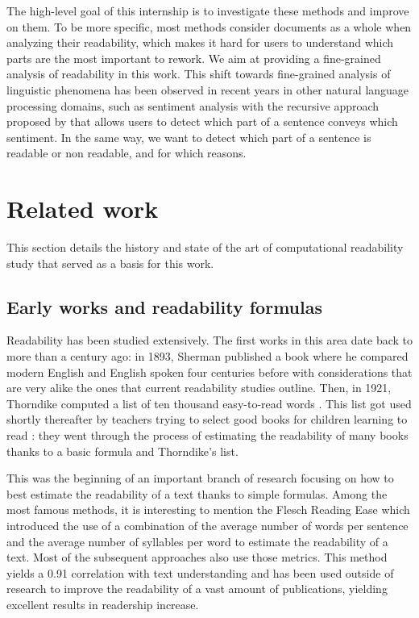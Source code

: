 \documentclass[a4paper, 11pt, onepage]{scrreprt}
\begin{document}
The high-level goal of this internship is to investigate these methods
and improve on them. To be more specific, most methods consider
documents as a whole when analyzing their readability, which makes it
hard for users to understand which parts are the most important to
rework. We aim at providing a fine-grained analysis of readability in
this work. This shift towards fine-grained analysis of linguistic
phenomena has been observed in recent years in other natural language
processing domains, such as sentiment analysis with the recursive
approach proposed by \cite{socher2013recursive} that allows users to
detect which part of a sentence conveys which sentiment. In the same
way, we want to detect which part of a sentence is readable or non
readable, and for which reasons.

\chapter{Related work}
\label{cha:sota}

This section details the history and state of the art of computational
readability study that served as a basis for this work.

\section{Early works and readability formulas}
\label{sec:early-works-and-formulas}
Readability has been studied extensively. The first works in this area
date back to more than a century ago: in 1893, Sherman published a
book \cite{sherman1893analytics} where he compared modern English and
English spoken four centuries before with considerations that are very
alike the ones that current readability studies outline. Then, in
1921, Thorndike computed a list of ten thousand easy-to-read words
\cite{thorndike1921teacher}. This list got used shortly thereafter by
teachers trying to select good books for children learning to read
\cite{lively1923method}: they went through the process of estimating
the readability of many books thanks to a basic formula and
Thorndike's list.

This was the beginning of an important branch of research focusing on
how to best estimate the readability of a text thanks to simple
formulas. Among the most famous methods, it is interesting to mention
the Flesch Reading Ease \cite{flesch1948new} which introduced the use
of a combination of the average number of words per sentence and the
average number of syllables per word to estimate the readability of a
text. Most of the subsequent approaches also use those metrics. This
method yields a 0.91 correlation with text understanding and has been
used outside of research to improve the readability of a vast amount
of publications, yielding excellent results in readership increase.
\end{document}
